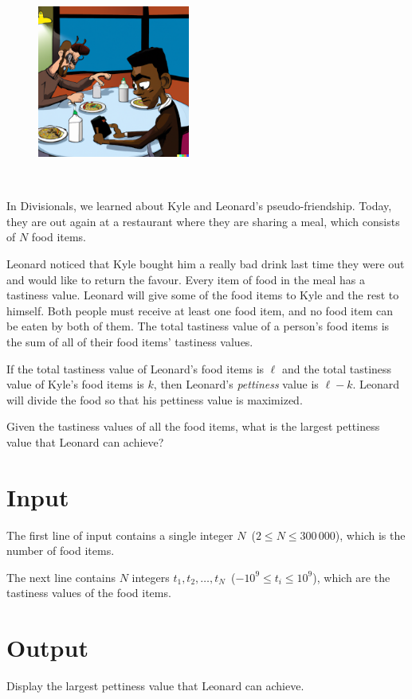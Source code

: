 
\begin{figure}
 \includegraphics[width=50mm]{img.png}
\end{figure}
~

In Divisionals, we learned about Kyle and Leonard's pseudo-friendship. Today, they are out again at a restaurant where they are sharing a meal, which consists of $N$ food items.

Leonard noticed that Kyle bought him a really bad drink last time they were out and would like to return the favour. Every item of food in the meal has a tastiness value. Leonard will give some of the food items to Kyle and the rest to himself. Both people must receive at least one food item, and no food item can be eaten by both of them. The total tastiness value of a person's food items is the sum of all of their food items' tastiness values.

If the total tastiness value of Leonard's food items is $\ell$ and the total tastiness value of Kyle's food items is $k$, then Leonard's \textit{pettiness} value is $\ell - k$. Leonard will divide the food so that his pettiness value is maximized.

Given the tastiness values of all the food items, what is the largest pettiness value that Leonard can achieve?


\section*{Input}

The first line of input contains a single integer $N$~($2 \leq N \leq 300\,000$), which is the number of food items.

The next line contains $N$ integers $t_1, t_2, \dots, t_N$~($-10^9 \leq t_i \leq 10^9$), which are the tastiness values of the food items.


\section*{Output}

Display the largest pettiness value that Leonard can achieve.

